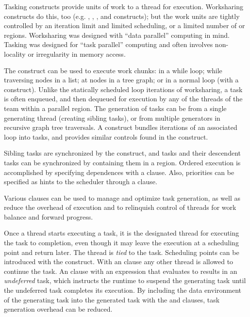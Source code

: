 \label{chap:tasking}

Tasking constructs provide units of work to a thread for execution.  
Worksharing constructs do this, too (e.g. , , 
, and  constructs); 
but the work units are tightly controlled by an iteration limit and limited 
scheduling, or a limited number of  or  regions. 
Worksharing was designed 
with ``data parallel'' computing in mind.  Tasking was designed for 
``task parallel'' computing and often involves non-locality or irregularity 
in memory access.

The  construct can be used to execute work chunks: in a while loop; 
while traversing nodes in a list; at nodes in a tree graph; 
or in a normal loop (with a  construct).  
Unlike the statically scheduled loop iterations of worksharing, a task is 
often enqueued, and then dequeued for execution by any of the threads of the
team within a parallel region. The generation of tasks can be from a single 
generating thread (creating sibling tasks), or from multiple generators
in recursive graph tree traversals. 
A  construct
bundles iterations of an associated loop into tasks, and provides 
similar controls found in the  construct.

Sibling tasks are synchronized by the  construct, and tasks
and their descendent tasks can be synchronized by containing them in
a  region.  Ordered execution is accomplished by specifying
dependences with a  clause. Also, priorities can be
specified as hints to the scheduler through a  clause.

Various clauses can be used to manage and optimize task generation,
as well as reduce the overhead of execution and to relinquish 
control of threads for work balance and forward progress. 

Once a thread starts executing a task, it is the designated thread
for executing the task to completion, even though it may leave the
execution at a scheduling point and return later.  The thread is \emph{tied}
to the task.  Scheduling points can be introduced with the 
construct.  With an  clause any other thread is allowed to continue
the task.  An  clause with an expression that evaluates to 
results in an \emph{undeferred} task, which instructs the runtime to suspend
the generating task until the undeferred task completes its execution.
By including the data environment of the generating task into the generated task with the 
 and  clauses, task generation overhead can be reduced.

